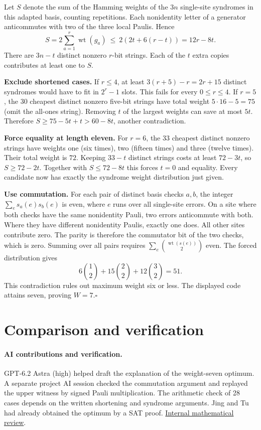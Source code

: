 \documentclass[11pt]{article}
\newcommand{\wt}{\operatorname{wt}}
\begin{document}
Let $S$ denote the sum of the Hamming weights of the $3n$ single-site syndromes in this adapted basis, counting repetitions. Each nonidentity letter of a generator anticommutes with two of the three local Paulis. Hence
\[
 S=2\sum_{a=1}^r\wt(g_a)\ \le\ 2(2t+6(r-t))=12r-8t .
\]
There are $3n-t$ distinct nonzero $r$-bit strings. Each of the $t$ extra copies contributes at least one to $S$.

\textbf{Exclude shortened cases.} If $r\le4$, at least $3(r+5)-r=2r+15$ distinct syndromes would have to fit in $2^r-1$ slots. This fails for every $0\le r\le4$. If $r=5$, the 30 cheapest distinct nonzero five-bit strings have total weight $5\cdot16-5=75$ (omit the all-ones string). Removing $t$ of the largest weights can save at most $5t$. Therefore $S\ge75-5t+t>60-8t$, another contradiction.

\textbf{Force equality at length eleven.} For $r=6$, the 33 cheapest distinct nonzero strings have weights one (six times), two (fifteen times) and three (twelve times). Their total weight is $72$. Keeping $33-t$ distinct strings costs at least $72-3t$, so $S\ge72-2t$. Together with $S\le72-8t$ this forces $t=0$ and equality. Every candidate now has exactly the syndrome weight distribution just given.

\textbf{Use commutation.} For each pair of distinct basis checks $a,b$, the integer $\sum_e s_a(e)s_b(e)$ is even, where $e$ runs over all single-site errors. On a site where both checks have the same nonidentity Pauli, two errors anticommute with both. Where they have different nonidentity Paulis, exactly one does. All other sites contribute zero. The parity is therefore the commutator bit of the two checks, which is zero. Summing over all pairs requires $\sum_e\binom{\wt(s(e))}{2}$ even. The forced distribution gives
\[
  6\binom{1}{2}+15\binom{2}{2}+12\binom{3}{2}=51.
\]
This contradiction rules out maximum weight six or less. The displayed code attains seven, proving $W=7$.\hfill$\square$

\section*{Comparison and verification}
\paragraph{AI contributions and verification.} GPT-6.2 Astra (high) helped draft the explanation of the weight-seven optimum. A separate project AI session checked the commutation argument and replayed the upper witness by signed Pauli multiplication. The arithmetic check of 28 cases depends on the written shortening and syndrome arguments. Jing and Tu had already obtained the optimum by a SAT proof. \href{https://github.com/shunyaekam/oo-research/blob/a5cde30636afbfe599efab6bf8bbbafe9c640c22/checks/small_qec/math-review.md}{Internal mathematical review}.
\end{document}
